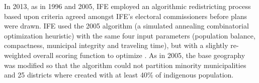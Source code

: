 \documentclass[letter,12pt]{article}
\begin{document}

In 2013, as in 1996 and 2005, IFE employed an algorithmic redistricting process based upon criteria agreed amongst IFE's electoral commissioners before plans were drawn. IFE used the 2005 algorithm (a simulated annealing combinatorial optimization heuristic) with the same four input parameters (population balance, compactness, municipal integrity and traveling time), but with a slightly re-weighted overall scoring function to optimize \citep{trelles.mtz.tesisItam.2007,acuerdoife2013}. As in 2005, the base geography was modified so that the algorithm could not partition minority municipalities and 25 districts where created with at least 40\% of indigenous population. 


\end{document}
